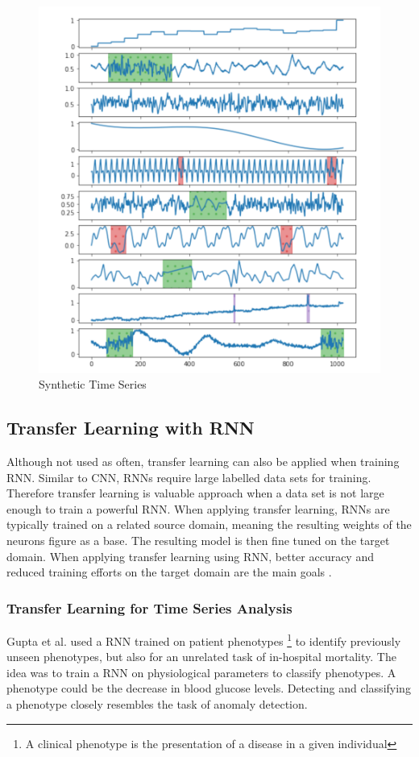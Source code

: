 \begin{figure}[h]
	\centering
	\includegraphics[scale=0.32]{Figures/Synthetic Time Series}
	\decoRule
	\caption[Synthetic Time Series]{Synthetic Time Series \parencite{Wen2019}}
	\label{fig:Pretraing data}
\end{figure}

\subsection{Transfer Learning with RNN}
Although not used as often, transfer learning can also be applied when training RNN. Similar to CNN, RNNs require large labelled data sets for training. Therefore transfer learning is valuable approach when a data set is not large enough to train a powerful RNN. When applying transfer learning, RNNs are typically trained on a related source domain, meaning the resulting weights of the neurons figure as a base. The resulting model is then fine tuned on the target domain. When applying transfer learning using RNN, better accuracy and reduced training efforts on the target domain are the main goals \parencite{Gupta2018}.



\subsubsection{Transfer Learning for Time Series Analysis}
Gupta et al. \parencite*{Gupta2018} used a RNN trained on patient phenotypes \footnote{A clinical phenotype is the presentation of a disease in a given individual} to identify previously unseen phenotypes, but also for an unrelated task of in-hospital mortality. The idea was to train a RNN on physiological parameters to classify phenotypes. A phenotype could be the decrease in blood glucose levels. Detecting and classifying a phenotype closely resembles the task of anomaly detection.

